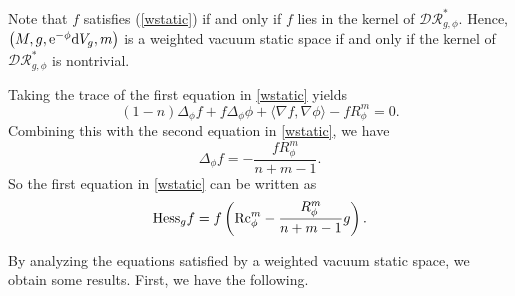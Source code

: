 \documentclass[pdftex]{sigma}
\numberwithin{equation}{section}
\begin{document}
Note that $f$ satisfies (\ref{wstatic}) if and only if
$f$ lies in the kernel of $\mathcal{DR}^*_{g,\phi}$.
Hence, $\bigl(M,g,{\rm e}^{-\phi}{\rm d}V_g,m\bigr)$ is a weighted vacuum static space
if and only if the kernel of $\mathcal{DR}^*_{g,\phi}$ is nontrivial.

Taking the trace of the first equation in \eqref{wstatic} yields
\begin{equation*}
 (1-n)\Delta_\phi f+f\Delta_\phi\phi+\langle \nabla f,\nabla \phi\rangle -fR_\phi^m=0.
\end{equation*}
Combining this with the second equation in \eqref{wstatic}, we have
\begin{equation}\label{wstatic_del}
 \Delta_\phi f=-\frac{f R_\phi^m}{n+m-1}.
\end{equation}
So the first equation in \eqref{wstatic} can be written as
\begin{equation}\label{wstatic2}
{\rm Hess}_gf=f\left({\rm Rc}_\phi^m-\frac{R_\phi^m}{n+m-1}g\right).
\end{equation}

By analyzing the equations satisfied by a weighted vacuum static space,
we obtain some results. First, we have the following.
\end{document}
